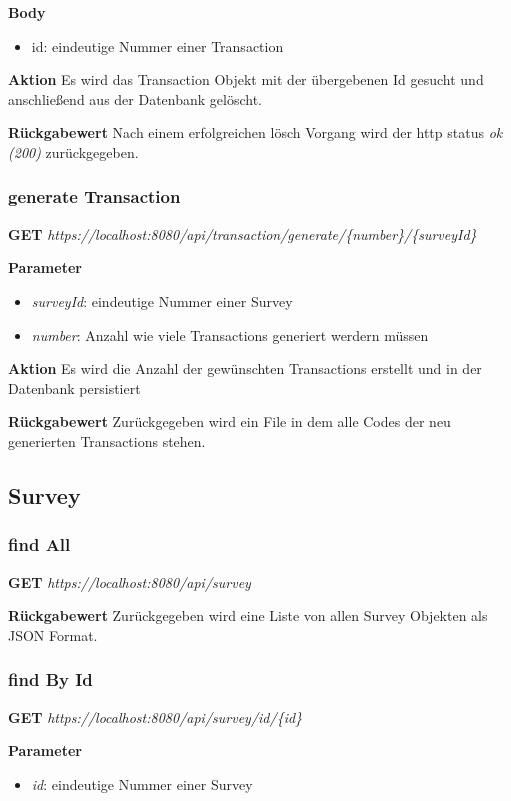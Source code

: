 \textbf{Body}
\begin{itemize}
    \item id: eindeutige Nummer einer Transaction
\end{itemize}

\textbf{Aktion}
Es wird das Transaction Objekt mit der übergebenen Id gesucht und anschließend
aus der Datenbank gelöscht.

\textbf{Rückgabewert}
Nach einem erfolgreichen lösch Vorgang wird der http status \emph{ok (200)} zurückgegeben.

\subsubsection{generate Transaction}
\textbf{GET} \emph{https://localhost:8080/api/transaction/generate/\{number\}/\{surveyId\}}

\textbf{Parameter}
\begin{itemize}
    \item \emph{surveyId}: eindeutige Nummer einer Survey
    \item \emph{number}: Anzahl wie viele Transactions generiert werdern müssen
\end{itemize}

\textbf{Aktion}
Es wird die Anzahl der gewünschten Transactions erstellt und in der Datenbank persistiert 

\textbf{Rückgabewert}
Zurückgegeben wird ein File in dem alle Codes der neu generierten Transactions stehen.

\subsection{Survey}
\subsubsection{find All}
\textbf{GET} \emph{https://localhost:8080/api/survey}

\textbf{Rückgabewert}
Zurückgegeben wird eine Liste von allen Survey Objekten als JSON
Format.

\subsubsection{find By Id}
\textbf{GET} \emph{https://localhost:8080/api/survey/id/\{id\}}

\textbf{Parameter}
\begin{itemize}
    \item \emph{id}: eindeutige Nummer einer Survey
\end{itemize}


